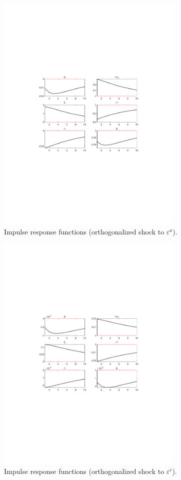  
\begin{figure}[H]
\centering 
\includegraphics[width=0.80\textwidth]{monetary/graphs/monetary_IRF_eps_a}
\caption{Impulse response functions (orthogonalized shock to ${\varepsilon^a}$).}
\label{Fig:IRF:eps_a}
\end{figure}
 
\begin{figure}[H]
\centering 
\includegraphics[width=0.80\textwidth]{monetary/graphs/monetary_IRF_eps_c_star}
\caption{Impulse response functions (orthogonalized shock to ${\varepsilon^c}$).}
\label{Fig:IRF:eps_c_star}
\end{figure}
 

